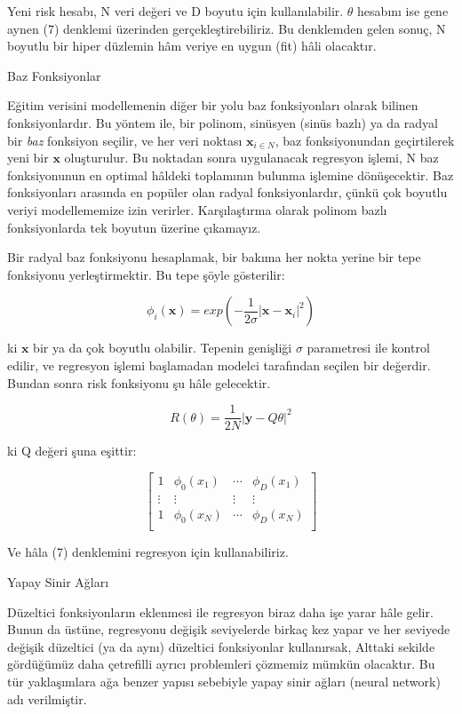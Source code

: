 \documentclass[12pt,fleqn]{article}\usepackage{../../common}
\begin{document}
Yeni risk hesabı, N veri değeri ve D boyutu için kullanılabilir. $\theta$
hesabını ise gene aynen (7) denklemi üzerinden gerçekleştirebiliriz. Bu
denklemden gelen sonuç, N boyutlu bir hiper düzlemin hâm veriye en uygun
(fit) hâli olacaktır.

Baz Fonksiyonlar

Eğitim verisini modellemenin diğer bir yolu baz fonksiyonları olarak
bilinen fonksiyonlardır. Bu yöntem ile, bir polinom, sinüsyen (sinüs
bazlı) ya da radyal bir {\em baz} fonksiyon seçilir, ve her veri noktası 
$\mathbf{x}_{i\in N}$, baz fonksiyonundan geçirtilerek yeni bir
$\mathbf{x}$ oluşturulur. Bu noktadan sonra uygulanacak regresyon
işlemi, N baz fonksiyonunun en optimal hâldeki toplamının bulunma
işlemine dönüşecektir. Baz fonksiyonları arasında en popüler olan
radyal fonksiyonlardır, çünkü çok boyutlu veriyi modellememize izin
verirler. Karşılaştırma olarak polinom bazlı fonksiyonlarda tek
boyutun üzerine çıkamayız. 

Bir radyal baz fonksiyonu hesaplamak, bir bakıma her nokta yerine bir
tepe fonksiyonu yerleştirmektir. Bu tepe şöyle gösterilir:

$$
  \phi_{i}(\mathbf{x}) = exp\left(
  -\frac{1}{2\sigma}\left|\mathbf{x} - \mathbf{x}_{i}\right|^2
  \right)
$$

ki $\mathbf{x}$ bir ya da çok boyutlu olabilir. Tepenin genişliği
$\sigma$ parametresi ile kontrol edilir, ve regresyon işlemi
başlamadan modelci tarafından seçilen bir değerdir. Bundan sonra risk
fonksiyonu şu hâle gelecektir. 

$$
  R(\theta) = \frac{1}{2N}|\mathbf{y} - Q\theta|^2
$$

ki Q değeri şuna eşittir:

$$
  \left[ \begin{array}{cccc}
      1 & \phi_{0}(x_{1}) & \cdots & \phi_{D}(x_{1}) \\
      \vdots & \vdots & \vdots & \vdots \\
      1 & \phi_{0}(x_{N}) & \cdots & \phi_{D}(x_{N}) \\
  \end{array} \right]
$$

Ve hâla (7) denklemini regresyon için kullanabiliriz. 

Yapay Sinir Ağları

Düzeltici fonksiyonların eklenmesi ile regresyon biraz daha işe yarar hâle
gelir. Bunun da üstüne, regresyonu değişik seviyelerde birkaç kez yapar ve
her seviyede değişik düzeltici (ya da aynı) düzeltici fonksiyonlar
kullanırsak, Alttaki sekilde gördüğümüz daha çetrefilli ayrıcı problemleri
çözmemiz mümkün olacaktır. Bu tür yaklaşımlara ağa benzer yapısı sebebiyle
yapay sinir ağları (neural network) adı verilmiştir. 
\end{document}
